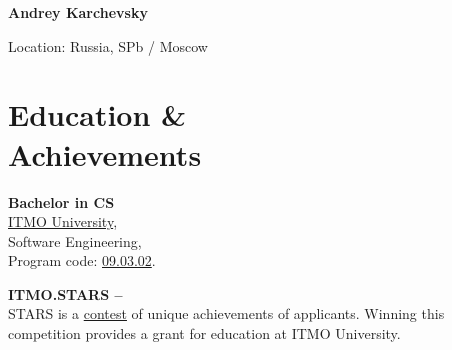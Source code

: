 \documentclass[a4paper,10pt]{article}
\begin{document}
\thispagestyle{empty}

\begin{adjustbox}{valign=t}
\begin{minipage}{0.3\textwidth}

\begin{center}

\MySkip

{\LARGE \bfseries Andrey Karchevsky}

\MySkip

Location: Russia, SPb / Moscow \\

\textcolor{ColorTwo}{\faEnvelopeO} 

\end{center}

\section*{Education \& \\ Achievements}
\begin{description}
    \raggedright
	\item [\normalfont \textcolor{ColorOne}{2023-2027}] \textbf{Bachelor in CS}\\ 
	\href{https://itmo.ru/}{ITMO University}, \\ Software Engineering, \\ Program code: \href{https://fitp.itmo.ru/p/about-fitp/753}{09.03.02}. \\
        \item [\normalfont \textcolor{ColorOne}{2023}] \textbf{ITMO.STARS -- }\\ 
        STARS is a \href{https://stars.itmo.ru/}{contest} of unique achievements of applicants. Winning this competition provides a grant for education at ITMO University.
\\
 

\end{description}
\end{minipage}
\end{adjustbox}
\end{document}
